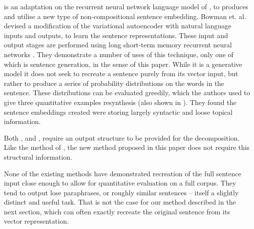 \documentclass[11pt]{article}
\theoremstyle{plain}
\theoremstyle{definition}
\begin{document}



\textcite{Bowman2015SmoothGeneration} is an adaptation on the recurrent neural network language model of \textcite{mikolov2011RnnLM}, to produces and utilise a new type of non-compositional sentence embedding. Bowman et. al. devised a modification of the variational autoencoder  \parencite{kingma2013auto} with natural language inputs and outputs, to learn the sentence representations. These input and output stages are performed using long short-term memory recurrent neural networks \parencite{hochreiter1997long}. They demonstrate a number of uses of this technique, only one of which is sentence generation, in the sense of this paper.
While it is a generative model it does not seek to recreate a sentence purely from its vector input, but rather to produce a series of probability distributions on the words in the sentence. These distributions can be evaluated greedily, which the authors used to give three quantitative examples resynthesis (also shown in ). They found the sentence embeddings created were storing largely syntactic and loose topical information. 


Both \textcite{Dinu2014CompositionalGeneration}, and  \textcite{iyyer2014generating}, require an output structure to be provided for the decomposition. Like the method of  \textcite{Bowman2015SmoothGeneration}, the new method proposed in this paper does not require this structural information.

None of the existing methods have demonstrated recreation of the full sentence input close enough to allow for quantitative evaluation on a full corpus. They tend to output lose paraphrases, or roughly similar sentences -- itself a slightly distinct and useful task.  That is not the case for our method described in the next section, which can often exactly recreate the original sentence from its vector representation.
\end{document}
